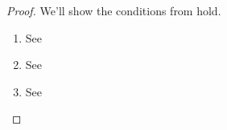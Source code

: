 \documentclass{amsart}
\theoremstyle{definition}
\begin{document}
\begin{proof}
    We'll show the conditions from  hold.
    \begin{enumerate}
        \item See 
        \item See 
        \item See 
    \end{enumerate}
\end{proof}

\newpage 

\renewcommand\refname{\LARGE References}


\end{document}
